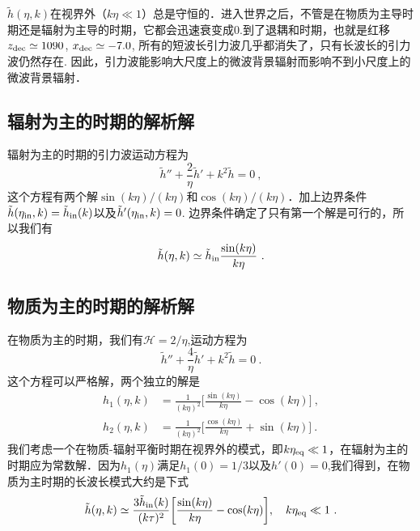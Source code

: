 $\tilde h(\eta,k)$在视界外（$k\eta\ll 1$）总是守恒的．进入世界之后，不管是在物质为主导时期还是辐射为主导的时期，它都会迅速衰变成0.到了退耦和时期，也就是红移$z_{\rm dec} \simeq 1090$, $x_{\rm dec}\simeq -7.0$, 所有的短波长引力波几乎都消失了，只有长波长的引力波仍然存在. 因此，引力波能影响大尺度上的微波背景辐射而影响不到小尺度上的微波背景辐射．

\subsection{辐射为主的时期的解析解}
辐射为主的时期的引力波运动方程为
\begin{equation}
\tilde h'' + \frac{2}{\eta} \tilde h' + k^2 \tilde h = 0~,
\end{equation}
这个方程有两个解$\sin(k\eta)/(k\eta)$和$\cos(k\eta)/(k\eta)$．加上边界条件$\tilde h(\eta_{\rm in},k) = \tilde h_{\rm in} (k)$以及$\tilde h'(\eta_{\rm in},k) = 0$. 边界条件确定了只有第一个解是可行的，所以我们有
\begin{equation}
\tilde h (\eta, k) \simeq \tilde h_{\rm in} \frac{\sin(k\eta)}{k\eta} ~.
\end{equation}

\subsection{物质为主的时期的解析解}
在物质为主的时期，我们有$\mathcal H = 2/\eta$,运动方程为
\begin{equation}
\tilde h'' + \frac{4}{\eta} \tilde h' + k^2 \tilde h = 0~.
\end{equation}
这个方程可以严格解，两个独立的解是
\begin{equation}
\begin{aligned}
h_1(\eta,k) & = \frac{1}{(k\eta)^2} \bigg[ \frac{\sin(k\eta)}{k\eta}  - \cos(k\eta) \bigg]~, \\
h_2(\eta,k) & = \frac{1}{(k\eta)^2} \bigg[ \frac{\cos(k\eta)}{k\eta} + \sin(k\eta) \bigg]~.
\end{aligned}
\end{equation}
我们考虑一个在物质-辐射平衡时期在视界外的模式，即$k\eta_{\rm eq}\ll 1$，在辐射为主的时期应为常数解．因为$h_1(\eta)$满足$h_1(0) = 1/3$以及$h'(0) = 0$,我们得到，在物质为主时期的长波长模式大约是下式
\begin{equation}
\tilde h (\eta,k) \simeq \frac{3\tilde h_{\rm in}(k)}{(k\tau)^2} \bigg[ \frac{\sin(k\eta)}{k\eta} - \cos(k\eta) \bigg], \quad k\eta_{\rm eq}\ll 1~.
\end{equation}


